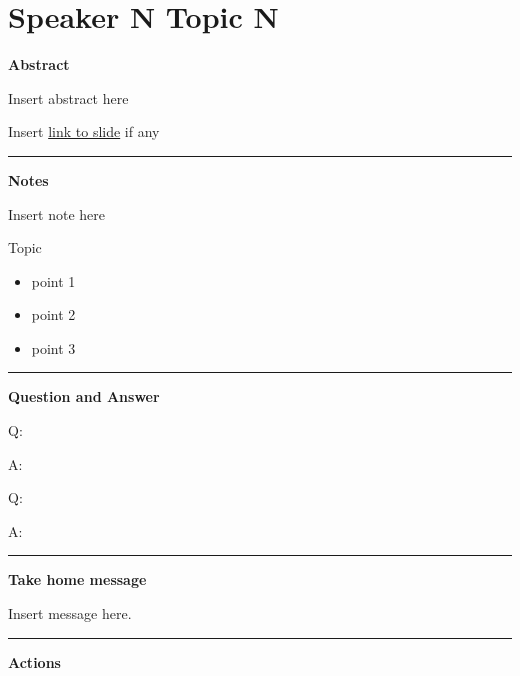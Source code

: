 \documentclass[
]{book}
\providecommand{\tightlist}{%
  \setlength{\itemsep}{0pt}\setlength{\parskip}{0pt}}
\begin{document}
\hypertarget{speaker-n-topic-n}{%
\chapter{Speaker N Topic N}\label{speaker-n-topic-n}}

\textbf{Abstract}

Insert abstract here

Insert \href{}{link to slide} if any

\begin{center}\rule{0.5\linewidth}{0.5pt}\end{center}

\textbf{Notes}

Insert note here

Topic

\begin{itemize}
\tightlist
\item
  point 1
\item
  point 2
\item
  point 3
\end{itemize}

\begin{center}\rule{0.5\linewidth}{0.5pt}\end{center}

\textbf{Question and Answer}

Q:

A:

Q:

A:

\begin{center}\rule{0.5\linewidth}{0.5pt}\end{center}

\textbf{Take home message}

Insert message here.

\begin{center}\rule{0.5\linewidth}{0.5pt}\end{center}

\textbf{Actions}
\end{document}
